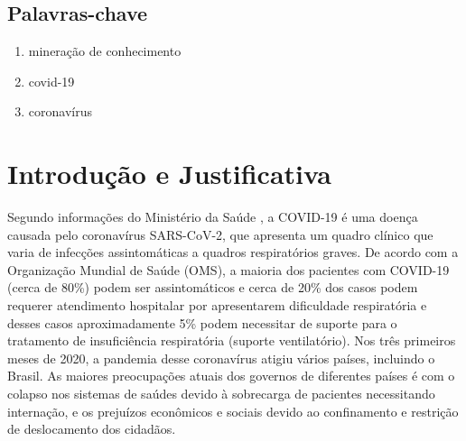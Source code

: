 \documentclass[
	12pt,				%
	a4paper,			%
	english,			%
	brazil,				%
	]{article}
\begin{document}
    	
    \subsection{Palavras-chave}

        \begin{enumerate}
        	\item minera\c c\~ ao de conhecimento
        	\item covid-19
        	\item coronav\' irus
        \end{enumerate}

\section{Introdu\c c\~ ao e Justificativa}


Segundo informa\c c\~ oes do Minist\' erio da Sa\' ude \cite{brasil20online},
a COVID-19 \' e uma doen\c ca causada pelo coronav\' irus SARS-CoV-2,
que apresenta um quadro cl\' inico que varia de infec\c c\~ oes assintom\' aticas
a quadros respirat\' orios graves.
De acordo com a Organiza\c c\~ ao Mundial de Sa\' ude (OMS),
a maioria dos pacientes com COVID-19 (cerca de 80\%) podem ser assintom\' aticos
e cerca de 20\% dos casos podem requerer atendimento hospitalar por apresentarem dificuldade
respirat\' oria e desses casos aproximadamente 5\% podem necessitar
de suporte para o tratamento de insufici\^ encia respirat\' oria
(suporte ventilat\' orio). Nos tr\^ es primeiros meses de 2020,
a pandemia desse coronav\' irus atigiu v\' arios pa\' ises,
incluindo o Brasil. As maiores preocupa\c c\~ oes atuais dos governos
de diferentes pa\' ises \' e com o colapso nos sistemas de sa\' udes
devido à sobrecarga de pacientes necessitando interna\c c\~ ao,
e os preju\' izos econômicos e sociais devido ao confinamento e
restri\c c\~ ao de deslocamento dos cidad\~ aos.
\end{document}

